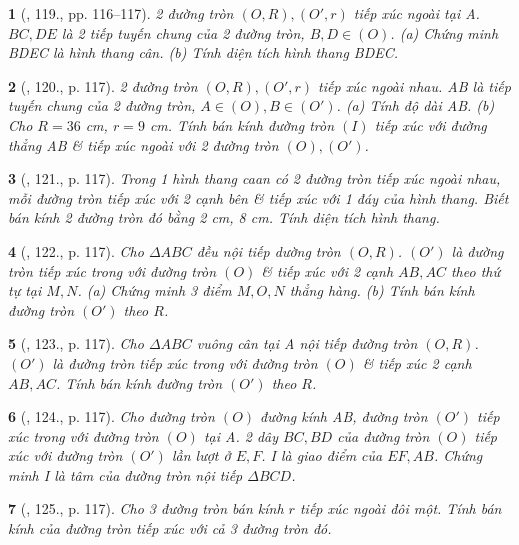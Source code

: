 \documentclass{article}
\newtheorem{baitoan}{}
\begin{document}
\begin{baitoan}[\cite{Binh_Toan_9_tap_1}, 119., pp. 116--117]
	2 đường tròn $(O,R),(O',r)$ tiếp xúc ngoài tại A. $BC,DE$ là 2 tiếp tuyến chung của 2 đường tròn, $B,D\in(O)$. (a) Chứng minh BDEC là hình thang cân. (b) Tính diện tích hình thang BDEC.
\end{baitoan}

\begin{baitoan}[\cite{Binh_Toan_9_tap_1}, 120., p. 117]
	2 đường tròn $(O,R),(O',r)$ tiếp xúc ngoài nhau. AB là tiếp tuyến chung của 2 đường tròn, $A\in(O),B\in(O')$. (a) Tính độ dài AB. (b) Cho $R = 36$ {\rm cm}, $r = 9$ {\rm cm}. Tính bán kính đường tròn $(I)$ tiếp xúc với đường thẳng AB \& tiếp xúc ngoài với 2 đường tròn $(O),(O')$.
\end{baitoan}

\begin{baitoan}[\cite{Binh_Toan_9_tap_1}, 121., p. 117]
	Trong 1 hình thang caan có 2 đường tròn tiếp xúc ngoài nhau, mỗi đường tròn tiếp xúc với 2 cạnh bên \& tiếp xúc với 1 đáy của hình thang. Biết bán kính 2 đường tròn đó bằng {\rm2 cm, 8 cm}. Tính diện tích hình thang.
\end{baitoan}

\begin{baitoan}[\cite{Binh_Toan_9_tap_1}, 122., p. 117]
	Cho $\Delta ABC$ đều nội tiếp dường tròn $(O,R)$. $(O')$ là đường tròn tiếp xúc trong với đường tròn $(O)$ \& tiếp xúc với 2 cạnh $AB,AC$ theo thứ tự tại $M,N$. (a) Chứng minh 3 điểm $M,O,N$ thẳng hàng. (b) Tính bán kính đường tròn $(O')$ theo $R$.
\end{baitoan}

\begin{baitoan}[\cite{Binh_Toan_9_tap_1}, 123., p. 117]
	Cho $\Delta ABC$ vuông cân tại A nội tiếp đường tròn $(O,R)$. $(O')$ là đường tròn tiếp xúc trong với đường tròn $(O)$ \& tiếp xúc 2 cạnh $AB,AC$. Tính bán kính đường tròn $(O')$ theo $R$.
\end{baitoan}

\begin{baitoan}[\cite{Binh_Toan_9_tap_1}, 124., p. 117]
	Cho đường tròn $(O)$ đường kính AB, đường tròn $(O')$ tiếp xúc trong với đường tròn $(O)$ tại A. 2 dây $BC,BD$ của đường tròn $(O)$ tiếp xúc với đường tròn $(O')$ lần lượt ở $E,F$. I là giao điểm của $EF,AB$. Chứng minh I là tâm của đường tròn nội tiếp $\Delta BCD$.
\end{baitoan}

\begin{baitoan}[\cite{Binh_Toan_9_tap_1}, 125., p. 117]
	Cho 3 đường tròn bán kính $r$ tiếp xúc ngoài đôi một. Tính bán kính của đường tròn tiếp xúc với cả 3 đường tròn đó.
\end{baitoan}
\end{document}
